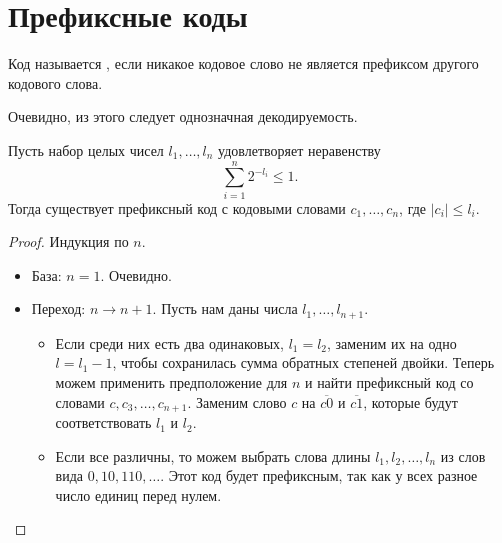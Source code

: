 \section{Префиксные коды}
\begin{defn}[]
	Код называется , если никакое кодовое слово не является префиксом другого кодового слова. 
\end{defn}
\begin{note}
    Очевидно, из этого следует однозначная декодируемость.
\end{note}

\begin{thm}\label{thm:exists_code}
    Пусть набор целых чисел $  l_1, \ldots , l_n$ удовлетворяет неравенству
	\[
	\sum_{i=1}^{n} 2^{-l_i} \le 1
	.\] 
	Тогда существует префиксный код с кодовыми словами $  c_1, \ldots , c_n$, где $ \lvert c_i \rvert  \le l_i$.
\end{thm}
\begin{proof}
    Индукция по $ n$.
	\begin{itemize}
		\item База: $ n = 1$. Очевидно.
		\item Переход: $ n \to  n+1$. Пусть нам даны числа $  l_1, \ldots , l_{n+1}$.

			\begin{itemize}
				\item Если среди них есть два одинаковых, $  l_1 = l_2$, заменим их на одно $ l = l_1 - 1$, чтобы сохранилась сумма обратных степеней двойки. Теперь можем применить предположение для $ n$ и найти префиксный код со словами $c, c_3, \ldots , c_{n+1}$. Заменим слово $ c$ на $ \overline{c0}$ и $\overline{c1}$, которые будут соответствовать $  l_1$ и $  l_2$. 
				\item Если все различны, то можем выбрать слова длины $  l_1, l_2, \ldots , l_n$ из слов вида $ 0, 10, 110, \ldots $. Этот код будет префиксным, так как у всех разное число единиц перед нулем.
			\end{itemize}
	\end{itemize}
\end{proof}


